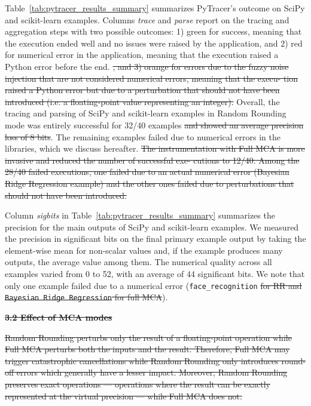 \documentclass[10pt,journal,compsoc]{IEEEtran}
\newcommand{\pytracer}[0]{PyTracer\xspace}
\DeclareRobustCommand{\remove}[1]{\textcolor{lightred}{\sout{#1}}}
\begin{document}
Table~\ref{tab:pytracer_results_summary} summarizes \pytracer's outcome on SciPy
and scikit-learn examples. Columns \textit{trace} and \textit{parse} report on
the tracing and aggregation steps with two possible outcomes: 1) green for
success, meaning that the execution ended well and no issues were raised by the
application, and 2) red for numerical error in the application, meaning that the
execution raised a Python error before the end. \remove{, and 3)
    orange for errors due to the fuzzy noise injection that are
    not considered numerical errors, meaning that the execu-
    tion raised a Python error but due to a perturbation that
    should not have been introduced (i.e. a floating-point value
    representing an integer).}
Overall, the tracing and parsing of SciPy and scikit-learn examples in Random
Rounding mode was entirely successful for 32/40 examples\remove{ and showed an average
    precision loss of 8 bits}. The remaining examples failed due to numerical errors
in the libraries, which we discuss hereafter. 
\remove{The instrumentation with Full MCA is
    more invasive and reduced the number of successful exe-
    cutions to 12/40. Among the 28/40 failed executions, one
    failed due to an actual numerical error (Bayesian Ridge
    Regression example) and the other ones failed due to
    perturbations that should not have been introduced.}

Column \textit{sigbits} in Table~\ref{tab:pytracer_results_summary} summarizes
the precision for the main outputs of SciPy and scikit-learn examples. We
measured the precision in significant bits on the final primary example output
by taking the element-wise mean for non-scalar values and, if the example
produces many outputs, the average value among them. The numerical
quality across all examples varied from 0 to 52, with an average of 44
significant bits. We note that only one example failed due to a
numerical error (\texttt{face\_recognition}
\remove{for RR and \texttt{Bayesian Ridge Regression} for full MCA}).

\noindent \remove{\textbf{3.2 Effect of MCA modes}}

\remove{
    Random Rounding perturbs only the result of a floating-point operation while
    Full MCA perturbs both the inputs and the result. Therefore, Full MCA may
    trigger catastrophic cancellations while Random Rounding only introduces
    round-off errors which generally have a lesser impact. Moreover, Random Rounding
    preserves exact operations --- operations where the result can be exactly
    represented at the virtual precision --- while Full MCA does not.}
\end{document}
